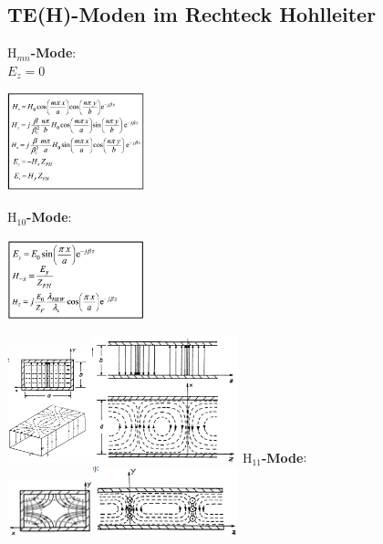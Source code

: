 \documentclass[english]{latex4ei/latex4ei_sheet}
\begin{document}
\begin{sectionbox}
	\subsection{TE(H)-Moden im Rechteck Hohlleiter}
	\textbf{$\text{H}_{mn}$-Mode}:\\
	$E_z = 0$
	\begin{center}\includegraphics[width = 4cm]{./img/Hmn.png}\end{center}


	\textbf{$\text{H}_{10}$-Mode}:
	\begin{center}\includegraphics[width = 4cm]{./img/H10.png}\end{center}
	\includegraphics[width = 2.5cm]{./img/H10-comb.jpeg}\includegraphics[width = 4.2cm]{./img/H10-bild2.png}
	\textbf{$\text{H}_{11}$-Mode}:\\
	\includegraphics[width = 2.5cm]{./img/H11-bild1.png}\includegraphics[width = 4.2cm]{./img/H11-bild2.png}
\end{sectionbox}
\end{document}
